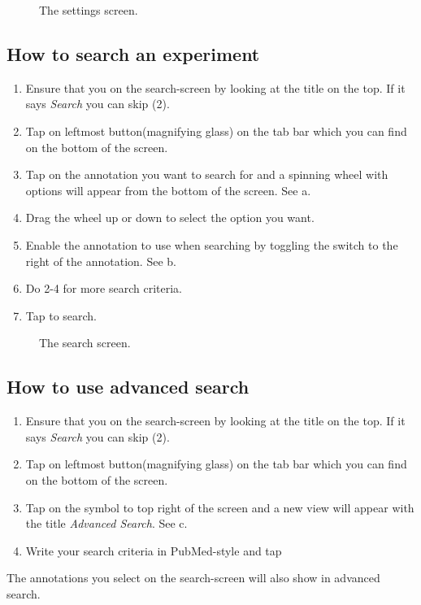 \begin{figure}[htb]
\caption{The settings screen.}
\label{fig:ios_more}
\end{figure}
\FloatBarrier

\subsection{How to search an experiment}

\begin{enumerate}
\item Ensure that you on the search-screen by looking at the title on the top. If it says \emph{Search} you can skip (2). 
\item Tap on leftmost button(magnifying glass) on the tab bar which you can find on the bottom of the screen.
\item Tap on the annotation you want to search for and a spinning wheel with options will appear from the bottom of the screen. See a.
\item Drag the wheel up or down to select the option you want.
\item Enable the annotation to use when searching by toggling the switch to the right of the annotation. See b.
\item Do 2-4 for more search criteria.
\item Tap  to search.
\end{enumerate}

\begin{figure}[ht]
\caption{The search screen.}
\label{fig:ios_search}
\end{figure}
\FloatBarrier

\subsection{How to use advanced search}

\begin{enumerate}
\item Ensure that you on the search-screen by looking at the title on the top. If it says \emph{Search} you can skip (2). 
\item Tap on leftmost button(magnifying glass) on the tab bar which you can find on the bottom of the screen.
\item Tap on the symbol to top right of the screen and a new view will appear with the title \emph{Advanced Search}. See c.
\item Write your search criteria in PubMed-style and tap 
\end{enumerate}
The annotations you select on the search-screen will also show in advanced search.

